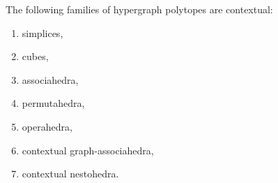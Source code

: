 \begin{samepage}
  \begin{thm}
    \label{thm:examples}
    The following families of hypergraph polytopes are contextual:
    \begin{enumerate}[label=(\alph*)]
      \item simplices,
      \item cubes,
      \item associahedra,
      \item permutahedra,
      \item operahedra,
      \item contextual graph-associahedra,
      \item contextual nestohedra.
    \end{enumerate}
  \end{thm}
\end{samepage}


